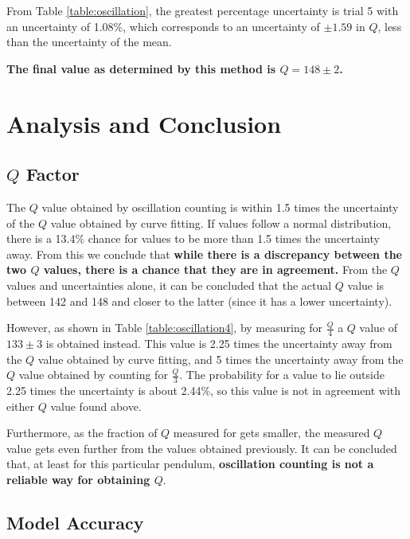 \documentclass[aps,twocolumn,secnumarabic,nobalancelastpage,amsmath,amssymb,nofootinbib]{revtex4}
\begin{document}
From Table \ref{table:oscillation}, the greatest percentage uncertainty is trial 5 with an uncertainty of 1.08\%, which
corresponds to an uncertainty of \(\pm 1.59\) in \(Q\), less than the uncertainty of the mean.

\textbf{The final value as determined by this method is \(Q = 148 \pm 2\).}


\section{Analysis and Conclusion}
\label{section:analysis}

\subsection{\texorpdfstring{\(Q\)}{Q} Factor}

The \(Q\) value obtained by oscillation counting is within 1.5 times the uncertainty of the \(Q\) value obtained by
curve fitting. If values follow a normal distribution, there is a 13.4\% chance for values to be more than 1.5 times the
uncertainty away. From this we conclude that \textbf{while there is a discrepancy between the two \(Q\) values, there is
a chance that they are in agreement.} From the \(Q\) values and uncertainties alone, it can be concluded that the actual
\(Q\) value is between 142 and 148 and closer to the latter (since it has a lower uncertainty).

However, as shown in Table \ref{table:oscillation4}, by measuring for \(\frac{Q}{4}\) a \(Q\) value of \(133 \pm 3\) is
obtained instead. This value is 2.25 times the uncertainty away from the \(Q\) value obtained by curve fitting, and 5
times the uncertainty away from the \(Q\) value obtained by counting for \(\frac{Q}{3}\). The probability for a value to
lie outside 2.25 times the uncertainty is about 2.44\%, so this value is not in agreement with either \(Q\) value found
above.

Furthermore, as the fraction of \(Q\) measured for gets smaller, the measured \(Q\) value gets even further from the
values obtained previously. It can be concluded that, at least for this particular pendulum, \textbf{oscillation
counting is not a reliable way for obtaining \(Q\)}.

\subsection{Model Accuracy}
\end{document}
